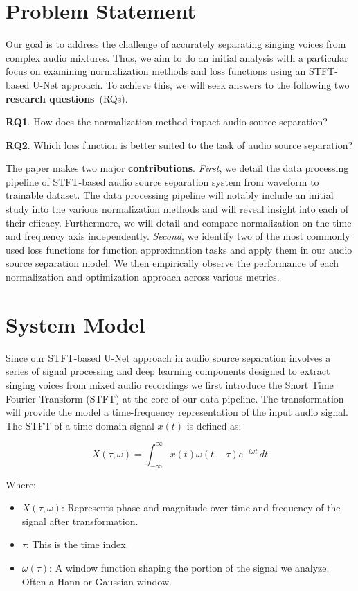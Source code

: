 \documentclass[conference]{IEEEtran}
\begin{document}
\section{Problem Statement}
Our goal is to address the challenge of accurately separating singing voices from complex audio mixtures. Thus, we aim to do an initial analysis with a particular focus on examining normalization methods and loss functions using an STFT-based U-Net approach. To achieve this, we will seek answers to the following two \textbf{research questions}~(RQs). 

\textbf{RQ1}. How does the normalization method impact audio source separation?

\textbf{RQ2}. Which loss function is better suited to the task of audio source separation?

The paper makes two major \textbf{contributions}. \textit{First}, we detail the data processing pipeline of STFT-based audio source separation system from waveform to trainable dataset. The data processing pipeline will notably include an initial study into the various normalization methods and will reveal insight into each of their efficacy. Furthermore, we will detail and compare normalization on the time and frequency axis independently. \textit{Second}, we identify two of the most commonly used loss functions for function approximation tasks and apply them in our audio source separation model. We then empirically observe the performance of each normalization and optimization approach across various metrics.


\section{System Model}
Since our STFT-based U-Net approach in audio source separation involves a series of signal processing and deep learning components designed to extract singing voices from mixed audio recordings we first introduce the Short Time Fourier Transform (STFT) at the core of our data pipeline. The transformation will provide the model a time-frequency representation of the input audio signal. The STFT of a time-domain signal \(x(t)\) is defined as:

\begin{equation}
X(\tau, \omega) = \int_{-\infty}^{\infty} x(t) \omega(t - \tau) e^{-i \omega t} \, dt
\end{equation}

Where:
\begin{itemize}
    \item \( X(\tau, \omega) \): Represents phase and magnitude over time and frequency of the signal after transformation.
    \item \( \tau \): This is the time index.
    \item \( \omega(\tau) \): A window function shaping the portion of the signal we analyze. Often a Hann or Gaussian window.
\end{itemize}
\end{document}
